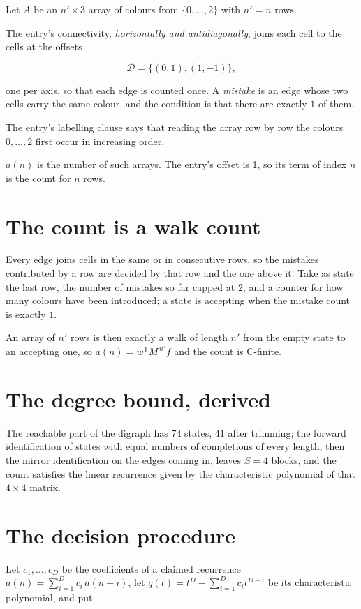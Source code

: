 \documentclass[11pt]{article}
\theoremstyle{definition}
\begin{document}
Let $A$ be an $n' \times 3$ array of colours from $\{0,\dots,2\}$ with $n' = n$ rows.

The entry's connectivity, {\itshape horizontally and antidiagonally}, joins each cell to the cells at the offsets

\[\mathcal{D} = \{(0,1), (1,-1)\},\]

one per axis, so that each edge is counted once. A {\itshape mistake} is an edge whose two cells carry the same colour, and the condition is that there are exactly $1$ of them.

The entry's labelling clause says that reading the array row by row the colours $0,\dots,2$ first occur in increasing order.

$a(n)$ is the number of such arrays. The entry's offset is 1, so its term of index $n$ is the count for $n$ rows.

\section{The count is a walk count}

Every edge joins cells in the same or in consecutive rows, so the mistakes contributed by a row are decided by that row and the one above it. Take as state the last row, the number of mistakes so far capped at $2$, and a counter for how many colours have been introduced; a state is accepting when the mistake count is exactly $1$.

An array of $n'$ rows is then exactly a walk of length $n'$ from the empty state to an accepting one, so $a(n) = w^{\mathsf T}M^{\,n'}f$ and the count is C-finite.

\section{The degree bound, derived}

The reachable part of the digraph has $74$ states, $41$ after trimming; the forward identification of states with equal numbers of completions of every length, then the mirror identification on the edges coming in, leaves $S = 4$ blocks, and the count satisfies the linear recurrence given by the characteristic polynomial of that $4\times4$ matrix.

\section{The decision procedure}

Let $c_1,\dots,c_D$ be the coefficients of a claimed recurrence $a(n) = \sum_{i=1}^{D} c_i\,a(n-i)$, let $q(t) = t^{D} - \sum_{i=1}^{D} c_i t^{D-i}$ be its characteristic polynomial, and put
\end{document}
